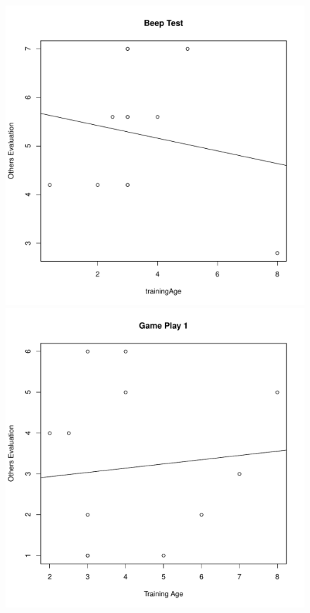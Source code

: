 \begin{CJK}{UTF8}{gbsn}
\begin{figure}[htbp]
  \centering
\includegraphics[scale=.2]{images/othersEvalBeepTrainingAge.pdf}
\includegraphics[scale=.2]{images/othersEval0109TrainingAge.pdf}

\end{figure}
\end{CJK}
